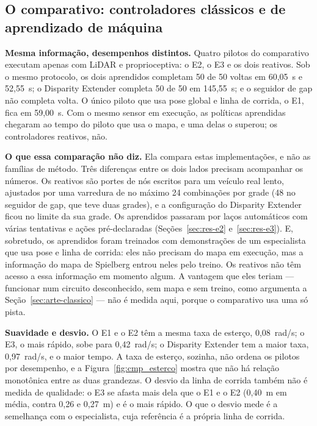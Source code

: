 \subsection{O comparativo: controladores clássicos e de aprendizado de máquina}\label{sec:res-disc-cmp}

\textbf{Mesma informação, desempenhos distintos.} Quatro pilotos do comparativo
executam apenas com LiDAR e proprioceptiva: o E2, o E3 e os dois reativos. Sob o
mesmo protocolo, os dois aprendidos completam 50 de 50 voltas em 60,05~s e
52,55~s; o Disparity Extender completa 50 de 50 em 145,55~s; e o seguidor de gap
não completa volta. O único piloto que usa pose global e linha de corrida, o
E1, fica em 59,00~s. Com o mesmo sensor em execução, as políticas aprendidas
chegaram ao tempo do piloto que usa o mapa, e uma delas o superou; os
controladores reativos, não.

\textbf{O que essa comparação não diz.} Ela compara estas implementações, e não
as famílias de método. Três diferenças entre os dois lados precisam acompanhar
os números. Os reativos são portes de nós escritos para um veículo real lento,
ajustados por uma varredura de no máximo 24 combinações por grade (48 no
seguidor de gap, que teve duas grades), e a configuração do
Disparity Extender ficou no limite da sua grade. Os aprendidos passaram por laços
automáticos com várias tentativas e ações pré-declaradas (Seções~\ref{sec:res-e2}
e~\ref{sec:res-e3}). E, sobretudo, os aprendidos foram treinados com
demonstrações de um especialista que usa pose e linha de corrida: eles não
precisam do mapa em execução, mas a informação do mapa de Spielberg entrou neles
pelo treino. Os reativos não têm acesso a essa informação em momento algum. A
vantagem que eles teriam --- funcionar num circuito desconhecido, sem mapa e sem
treino, como argumenta a Seção~\ref{sec:arte-classico} --- não é medida aqui,
porque o comparativo usa uma só pista.

\textbf{Suavidade e desvio.} O E1 e o E2 têm a mesma taxa de esterço,
0,08~rad/s; o E3, o mais rápido, sobe para 0,42~rad/s;
o Disparity Extender tem a maior taxa, 0,97~rad/s, e o maior tempo. A taxa de
esterço, sozinha, não ordena os pilotos por desempenho, e a
Figura~\ref{fig:cmp_esterco} mostra que não há relação monotônica entre as duas
grandezas. O desvio da linha de corrida também não é medida de qualidade: o E3
se afasta mais dela que o E1 e o E2 (0,40~m em média, contra 0,26 e 0,27~m) e é o
mais rápido. O que o desvio mede é a semelhança com o especialista, cuja
referência é a própria linha de corrida.

